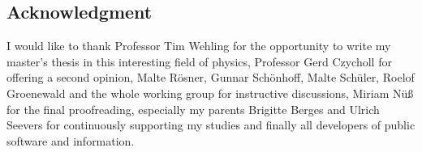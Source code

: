 
\begin{center}
    \begin{minipage}{2\textwidth/3}
        \chapter{Acknowledgment}

        I would like to thank Professor Tim Wehling for the opportunity to write
        my master's thesis in this interesting field of physics, Professor Gerd
        Czycholl for offering a second opinion, Malte Rösner, Gunnar Schönhoff,
        Malte Schüler, Roelof Groenewald and the whole working group for
        instructive discussions, Miriam Nüß for the final proofreading,
        especially my parents Brigitte Berges and Ulrich Seevers for
        continuously supporting my studies and finally all developers of public
        software and information.
    \end{minipage}
\end{center}
